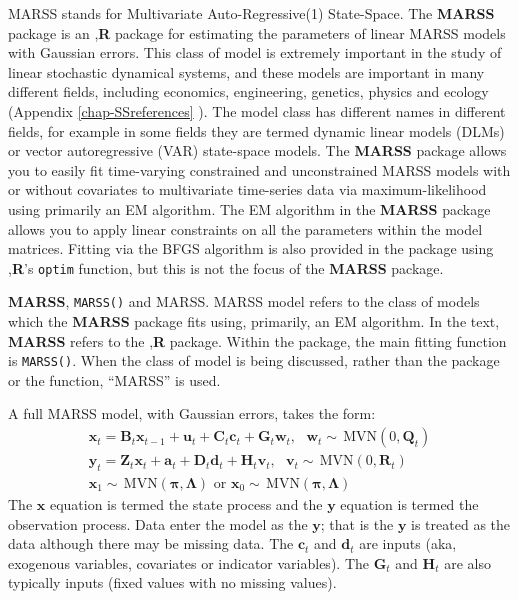 \documentclass[12pt,]{book}
\begin{document}
MARSS stands for Multivariate Auto-Regressive(1) State-Space. The \textbf{MARSS} package is an ,\textbf{R} package for estimating the parameters of linear MARSS models with Gaussian errors. This class of model is extremely important in the study of linear stochastic dynamical systems, and these models are important in many different fields, including economics, engineering, genetics, physics and ecology (Appendix \ref{chap-SSreferences} ). The model class has different names in different fields, for example in some fields they are termed dynamic linear models (DLMs) or vector autoregressive (VAR) state-space models. The \textbf{MARSS} package allows you to easily fit time-varying constrained and unconstrained MARSS models with or without covariates to multivariate time-series data via maximum-likelihood using primarily an EM algorithm. The EM algorithm in the \textbf{MARSS} package allows you to apply linear constraints on all the parameters within the model matrices. Fitting via the BFGS algorithm is also provided in the package using ,\textbf{R}'s \texttt{optim} function, but this is not the focus of the \textbf{MARSS} package.

\textbf{MARSS}, \texttt{MARSS()} and MARSS. MARSS model refers to the class of models which the \textbf{MARSS} package fits using, primarily, an EM algorithm. In the text, \textbf{MARSS} refers to the ,\textbf{R} package. Within the package, the main fitting function is \texttt{MARSS()}. When the class of model is being discussed, rather than the package or the function, ``MARSS'' is used.

A full MARSS model, with Gaussian errors, takes the form:
\begin{equation}\label{eq:marss}
\begin{gathered}
\mathbf{x}_t = \mathbf{B}_t\mathbf{x}_{t-1} + \mathbf{u}_t + \mathbf{C}_t\mathbf{c}_t + \mathbf{G}_t\mathbf{w}_t, \text{ } \mathbf{w}_t \sim \,\text{MVN}(0,\mathbf{Q}_t) \\
\mathbf{y}_t = \mathbf{Z}_t\mathbf{x}_t + \mathbf{a}_t + \mathbf{D}_t\mathbf{d}_t + \mathbf{H}_t\mathbf{v}_t, \text{ } \mathbf{v}_t \sim \,\text{MVN}(0,\mathbf{R}_t) \\
\mathbf{x}_1 \sim \,\text{MVN}(\boldsymbol{\pi},\boldsymbol{\Lambda}) \text{ or } \mathbf{x}_0 \sim \,\text{MVN}(\boldsymbol{\pi},\boldsymbol{\Lambda})
\end{gathered}
\end{equation}
The \(\mathbf{x}\) equation is termed the state process and the \(\mathbf{y}\) equation is termed the observation process. Data enter the model as the \(\mathbf{y}\); that is the \(\mathbf{y}\) is treated as the data although there may be missing data. The \(\mathbf{c}_t\) and \(\mathbf{d}_t\) are inputs (aka, exogenous variables, covariates or indicator variables). The \(\mathbf{G}_t\) and \(\mathbf{H}_t\) are also typically inputs (fixed values with no missing values).
\end{document}
